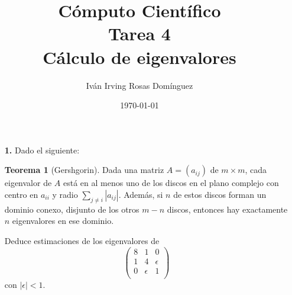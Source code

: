 \documentclass[letterpaper]{article}
\title{\textbf{Cómputo Científico\\Tarea 4\\Cálculo de eigenvalores}}
\author{Iván Irving Rosas Domínguez}
\date{\today}
\newcommand{\1}{\mathds{1}}
\theoremstyle{definition}
\theoremstyle{definition}
\newtheorem{teo}{Teorema}
\theoremstyle{definition}
\theoremstyle{definition}
\theoremstyle{definition}
\begin{document}
\maketitle


\begin{enumerate}
    \item[\textbf{1.}] Dado el siguiente:
    \begin{teo}[Gershgorin]
        Dada una matriz $A=(a_{ij})$ de $m\times m$, cada eigenvalor de $A$ está en al menos
        uno de los discos en el plano complejo con centro en $a_{ii}$ y radio $\sum_{j\neq i}|a_{ij}|$. 
        Además, si $n$ de estos discos forman un dominio conexo, disjunto de los otros $m-n$ discos, 
        entonces hay exactamente $n$ eigenvalores en ese dominio.
    \end{teo}
    Deduce estimaciones de los eigenvalores de 
\[
    \begin{pmatrix}
    8 & 1 & 0\\
    1 & 4 & \epsilon\\
    0 & \epsilon & 1\\    
    \end{pmatrix}
    \]
    con $|\epsilon|<1$.\\


\end{enumerate}
\end{document}
